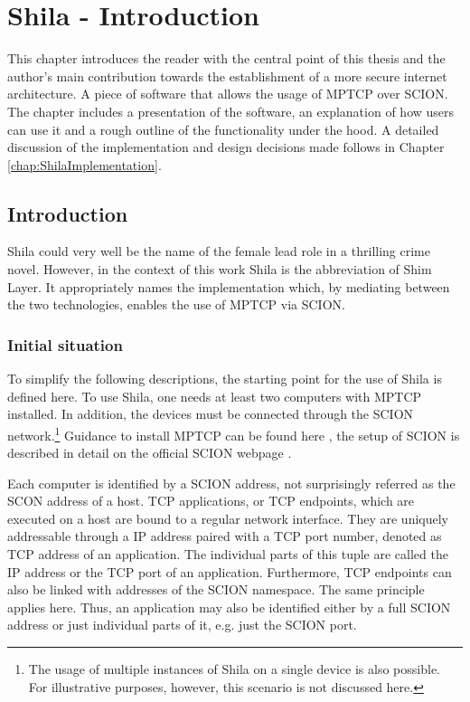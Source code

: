 
\chapter{Shila - Introduction}
\label{chap:ShilaIntroduction}

This chapter introduces the reader with the central point of this thesis and the author's main contribution towards the establishment of a more secure internet architecture. A piece of software that allows the usage of MPTCP over SCION. The chapter includes a presentation of the software, an explanation of how users can use it and a rough outline of the functionality under the hood. A detailed discussion of the implementation and design decisions made follows in Chapter \ref{chap:ShilaImplementation}.   

\section{Introduction}
\label{sec:ShilaIntroduction}

Shila could very well be the name of the female lead role in a thrilling crime novel. However, in the context of this work Shila is the abbreviation of Shim Layer. It appropriately names the implementation which, by mediating between the two technologies, enables the use of MPTCP via SCION.

\subsection{Initial situation}
\label{subsec:ShilaInitialSituation}

To simplify the following descriptions, the starting point for the use of Shila is defined here. To use Shila, one needs at least two computers with MPTCP installed. In addition, the devices must be connected through the SCION network.\footnote{The usage of multiple instances of Shila on a single device is also possible. For illustrative purposes, however, this scenario is not discussed here.} Guidance to install MPTCP can be found here \cite{MPTCPWebMain}, the setup of SCION is described in detail on the official SCION webpage \cite{SCIONWebMain}.

Each computer is identified by a SCION address, not surprisingly referred as the SCON address of a host. TCP applications, or TCP endpoints, which are executed on a host are bound to a regular network interface. They are uniquely addressable through a IP address paired with a TCP port number, denoted as TCP address of an application. The individual parts of this tuple are called the IP address or the TCP port of an application. Furthermore, TCP endpoints can also be linked with addresses of the SCION namespace. The same principle applies here. Thus, an application may also be identified either by a full SCION address or just individual parts of it, e.g. just the SCION port.

